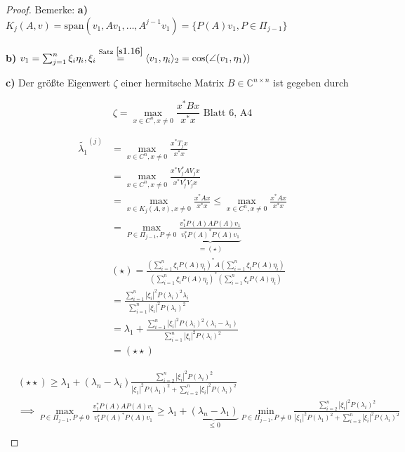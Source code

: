 \documentclass{book}
\def\C{\mathbb{C}}
\begin{document}
            \begin{proof}
                Bemerke: \textbf{a)} $K_j(A,v)=\text{span}(v_1,Av_1,\dots ,A^{j-1}v_1)=\{P(A)v_1,P\in\Pi_{j-1}\}$
                
                \textbf{b)} $v_1=\sum_{j=1}^n\xi_i\eta_i,\xi_i\stackrel{\text{Satz } \ref{s1.16}}{=}\langle v_1,\eta_i \rangle_2=\cos(\angle(v_1,\eta_1))$

                \textbf{c)} Der größte Eigenwert $\zeta$ einer hermitsche Matrix $B\in\C^{n\times n}$ ist gegeben durch

                \[
                    \zeta=\max_{x\in C^n,x\neq 0}\frac{x^* B x}{x^* x}    \text{  Blatt 6, A4}
                \]

                \begin{align*}
                    \tilde{\lambda_1}^{(j)}&=\max_{x\in C^n,x\neq 0}\frac{x^* T_j x}{x^* x}\\
                    &=\max_{x\in C^n,x\neq 0}\frac{x^* V_j^*AV_j x}{x^*V^*_j V_j x}\\
                    &=\max_{x\in K_j(A,v),x\neq 0}\frac{x^* Ax}{x^*x}\leq \max_{x\in C^n,x\neq 0}\frac{x^*Ax}{x^* x}\\
                    &= \max_{P\in \Pi_{j-1},P\neq 0}\underbrace{\frac{v_1^* P(A)AP(A)v_1}{v_1^*P(A)^*P(A)v_1}}_{=(\star)}\\
                    &(\star) = \frac{(\sum_{i=1}^n\xi_iP(A)\eta_i)^*A(\sum_{i=1}^n\xi_iP(A)\eta_i)}{(\sum_{i=1}^n\xi_iP(A)\eta_i)^*(\sum_{i=1}^n\xi_iP(A)\eta_i)}\\
                    &=\frac{\sum_{i=1}^n \left\vert \xi_i \right\vert^2 P(\lambda_i)^2 \lambda_i}{\sum_{i=1}^n \left\vert \xi_i \right\vert^2 P(\lambda_i)^2}\\
                    &=\lambda_1 + \frac{\sum_{i=1}^n \left\vert \xi_i \right\vert^2 P(\lambda_i)^2 (\lambda_i-\lambda_1)}{\sum_{i=1}^n \left\vert \xi_i \right\vert^2 P(\lambda_i)^2}\\
                    &=(\star\star)
                \end{align*}

                \begin{align*}
                    &(\star\star)\geq \lambda_1 +(\lambda_n-\lambda_i)\frac{\sum_{i=2}^n\left\vert \xi_i \right\vert^2P(\lambda_i)^2}{\left\vert \xi_1 \right\vert^2P(\lambda_1)^2+\sum_{i=2}^n\left\vert \xi_i \right\vert^2P(\lambda_i)^2}\\ 
                    &\implies \max_{P\in \Pi_{j-1},P\neq 0}\frac{v_1^* P(A)AP(A)v_1}{v_1^*P(A)^*P(A)v_1}\geq \lambda_1 + \underbrace{(\lambda_n-\lambda_1)}_{\leq 0}\min_{P\in \Pi_{j-1},P\neq 0}\frac{\sum_{i=2}^n\left\vert \xi_i \right\vert^2P(\lambda_i)^2}{\left\vert \xi_1 \right\vert^2P(\lambda_1)^2+\sum_{i=2}^n\left\vert \xi_i \right\vert^2P(\lambda_i)^2}\\ 
                \end{align*}


\end{proof}
\end{document}
